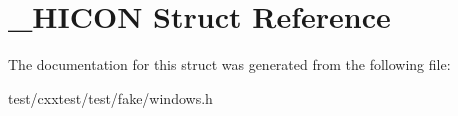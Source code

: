 \hypertarget{struct__HICON}{\section{\-\_\-\-H\-I\-C\-O\-N Struct Reference}
\label{struct__HICON}
}


The documentation for this struct was generated from the following file\-:\begin{DoxyCompactItemize}
\item 
test/cxxtest/test/fake/windows.\-h\end{DoxyCompactItemize}

